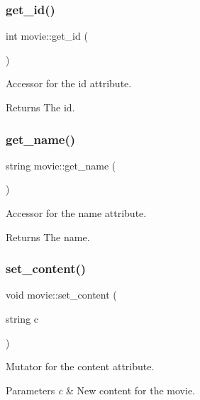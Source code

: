 \subsubsection{\texorpdfstring{get\+\_\+id()}{get\_id()}}
{\footnotesize\ttfamily int movie\+::get\+\_\+id (\begin{DoxyParamCaption}{ }\end{DoxyParamCaption})}



Accessor for the id attribute. 

\begin{DoxyReturn}{Returns}
The id. 
\end{DoxyReturn}
\mbox{\label{classmovie_acf7b3b85ac5cff85c7cc878cb42a6a4b}} 
\subsubsection{\texorpdfstring{get\+\_\+name()}{get\_name()}}
{\footnotesize\ttfamily string movie\+::get\+\_\+name (\begin{DoxyParamCaption}{ }\end{DoxyParamCaption})}



Accessor for the name attribute. 

\begin{DoxyReturn}{Returns}
The name. 
\end{DoxyReturn}
\mbox{\label{classmovie_a8e27df5de3f14e52e125240a913dbbde}} 
\subsubsection{\texorpdfstring{set\+\_\+content()}{set\_content()}}
{\footnotesize\ttfamily void movie\+::set\+\_\+content (\begin{DoxyParamCaption}\item[{string}]{c }\end{DoxyParamCaption})}



Mutator for the content attribute. 


\begin{DoxyParams}{Parameters}
{\em c} & New content for the movie. \\
\hline
\end{DoxyParams}


